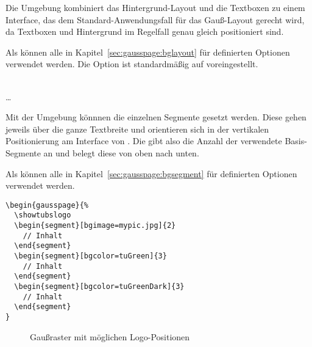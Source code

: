 Die Umgebung  kombiniert das Hintergrund-Layout
und die Textboxen zu einem Interface, das dem Standard-Anwendungsfall für
das Gauß-Layout gerecht wird, da Textboxen und Hintergrund im Regelfall
genau gleich positioniert sind.

Als  können alle in Kapitel~\ref{sec:gausspage:bglayout}
für  definierten Optionen verwendet werden.
Die Option  ist standardmäßig auf 
voreingestellt.

\begin{Declaration}
    \\
  \quad\dots\\
\end{Declaration}

Mit der Umgebung  könnnen die einzelnen
Segmente gesetzt werden.
Diese gehen jeweils über die ganze Textbreite und orientieren sich
in der vertikalen Positionierung am Interface von .
Die  gibt also die Anzahl der verwendete Basis-Segmente an
und belegt diese von oben nach unten.

Als  können alle in Kapitel~\ref{sec:gausspage:bgsegment}
für  definierten Optionen verwendet werden. %


\begin{lstlisting}[captionpos=b,caption={Beispiel-Nutzung von gausspage}]
\begin{gausspage}{%
  \showtubslogo
  \begin{segment}[bgimage=mypic.jpg]{2}
    // Inhalt
  \end{segment}
  \begin{segment}[bgcolor=tuGreen]{3}
    // Inhalt
  \end{segment}
  \begin{segment}[bgcolor=tuGreenDark]{3}
    // Inhalt
  \end{segment}
}
\end{lstlisting}

\begin{figure}\centering
  \begin{minipage}{0.35\textwidth}
    \label{fig:gausspage:topsender}
  \end{minipage}
  \quad
  \begin{minipage}{0.35\textwidth}
    \label{fig:gausspage:bottomsender}
  \end{minipage}
  \caption{Gaußraster mit möglichen Logo-Positionen}\label{fig:gausspage}
\end{figure}
